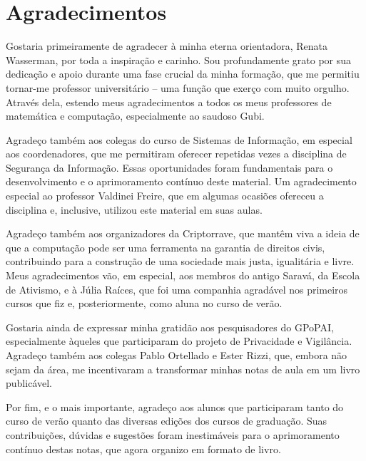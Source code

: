 \chapter*{Agradecimentos}

Gostaria primeiramente de agradecer à minha eterna orientadora, Renata Wasserman, por toda a inspiração e carinho.
Sou profundamente grato por sua dedicação e apoio durante uma fase crucial da minha formação, que me permitiu tornar-me professor universitário -- uma função que exerço com muito orgulho.
Através dela, estendo meus agradecimentos a todos os meus professores de matemática e computação, especialmente ao saudoso Gubi.

Agradeço também aos colegas do curso de Sistemas de Informação, em especial aos coordenadores, que me permitiram oferecer repetidas vezes a disciplina de Segurança da Informação.
Essas oportunidades foram fundamentais para o desenvolvimento e o aprimoramento contínuo deste material.
Um agradecimento especial ao professor Valdinei Freire, que em algumas ocasiões ofereceu a disciplina e, inclusive, utilizou este material em suas aulas.

Agradeço também aos organizadores da Criptorrave, que mantêm viva a ideia de que a computação pode ser uma ferramenta na garantia de direitos civis, contribuindo para a construção de uma sociedade mais justa, igualitária e livre.
Meus agradecimentos vão, em especial, aos membros do antigo Saravá, da Escola de Ativismo, e à Júlia Raíces, que foi uma companhia agradável nos primeiros cursos que fiz e, posteriormente, como aluna no curso de verão.

Gostaria ainda de expressar minha gratidão aos pesquisadores do GPoPAI, especialmente àqueles que participaram do projeto de Privacidade e Vigilância.
Agradeço também aos colegas Pablo Ortellado e Ester Rizzi, que, embora não sejam da área, me incentivaram a transformar minhas notas de aula em um livro publicável.

Por fim, e o mais importante, agradeço aos alunos que participaram tanto do curso de verão quanto das diversas edições dos cursos de graduação.
Suas contribuições, dúvidas e sugestões foram inestimáveis para o aprimoramento contínuo destas notas, que agora organizo em formato de livro.
